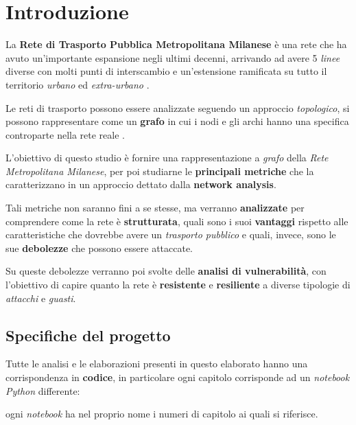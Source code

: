
\chapter*{Introduzione}

La \textbf{Rete di Trasporto Pubblica Metropolitana Milanese} è una rete che ha avuto un'importante espansione negli ultimi decenni, arrivando ad avere 5 \textit{linee} diverse con molti punti di interscambio e un'estensione ramificata su tutto il territorio \textit{urbano} ed \textit{extra-urbano} \cite{ATM2025}.

Le reti di trasporto possono essere analizzate seguendo un approccio \textit{topologico}, si possono rappresentare come un \textbf{grafo} in cui i nodi e gli archi hanno una specifica controparte nella rete reale \cite{MattssonJenelius2015}.

L'obiettivo di questo studio è fornire una rappresentazione a \textit{grafo} della \textit{Rete Metropolitana Milanese}, per poi studiarne le \textbf{principali metriche} che la caratterizzano in un approccio dettato dalla \textbf{network analysis}.

Tali metriche non saranno fini a se stesse, ma verranno \textbf{analizzate} per comprendere come la rete è \textbf{strutturata}, quali sono i suoi \textbf{vantaggi} rispetto alle caratteristiche che dovrebbe avere un \textit{trasporto pubblico} e quali, invece, sono le sue \textbf{debolezze} che possono essere attaccate.

Su queste debolezze verranno poi svolte delle \textbf{analisi di vulnerabilità}, con l'obiettivo di capire quanto la rete è \textbf{resistente} e \textbf{resiliente} a diverse tipologie di \textit{attacchi} e \textit{guasti}.

\section*{Specifiche del progetto}
Tutte le analisi e le elaborazioni presenti in questo elaborato hanno una corrispondenza in \textbf{codice}, in particolare ogni capitolo corrisponde ad un \textit{notebook Python} differente: 

\begin{center}
ogni \textit{notebook} ha nel proprio nome i numeri di capitolo ai quali si riferisce.
\end{center}


